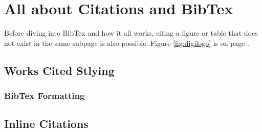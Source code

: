 \documentclass[./dissertation.tex]{subfiles}
\begin{document}
    \chapter{All about Citations and BibTex}
    Before diving into BibTex and how it all works, citing a figure or table that does not exist in the same subpage is also possible. Figure \ref{fig:digilogo} is on page \pageref{fig:digilogo}.
    \section{Works Cited Stlying}
      \subsection{BibTex Formatting}
    \section{Inline Citations}
\end{document}
